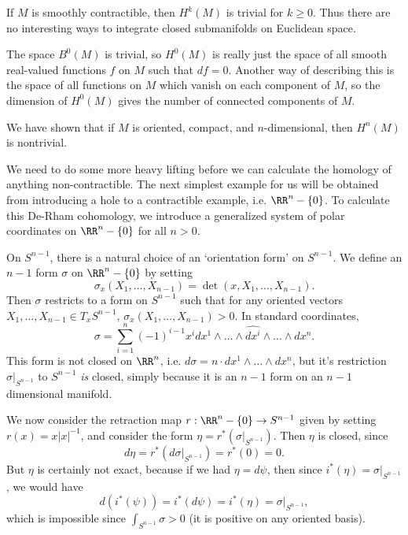 \begin{example}
    If $M$ is smoothly contractible, then $H^k(M)$ is trivial for $k \geq 0$. Thus there are no interesting ways to integrate closed submanifolds on Euclidean space.
\end{example}

\begin{example}
    The space $B^0(M)$ is trivial, so $H^0(M)$ is really just the space of all smooth real-valued functions $f$ on $M$ such that $df = 0$. Another way of describing this is the space of all functions on $M$ which vanish on each component of $M$, so the dimension of $H^0(M)$ gives the number of connected components of $M$.
\end{example}

\begin{example}
    We have shown that if $M$ is oriented, compact, and $n$-dimensional, then $H^n(M)$ is nontrivial.
\end{example}

We need to do some more heavy lifting before we can calculate the homology of anything non-contractible. The next simplest example for us will be obtained from introducing a hole to a contractible example, i.e. $\RR^n - \{ 0 \}$. To calculate this De-Rham cohomology, we introduce a generalized system of polar coordinates on $\RR^n - \{ 0 \}$ for all $n > 0$.

On $S^{n-1}$, there is a natural choice of an `orientation form' on $S^{n-1}$. We define an $n-1$ form $\sigma$ on $\RR^n - \{ 0 \}$ by setting
%
\[ \sigma_x(X_1, \dots, X_{n-1}) = \det(x,X_1, \dots, X_{n-1}). \]
%
Then $\sigma$ restricts to a form on $S^{n-1}$ such that for any oriented vectors $X_1, \dots, X_{n-1} \in T_x S^{n-1}$, $\sigma_x(X_1, \dots, X_{n-1}) > 0$. In standard coordinates,
%
\[ \sigma = \sum_{i = 1}^n (-1)^{i-1} x^i dx^1 \wedge \dots \wedge \widehat{dx^i} \wedge \dots \wedge dx^n. \]
%
This form is not closed on $\RR^n$, i.e. $d\sigma = n \cdot dx^1 \wedge \dots \wedge dx^n$, but it's restriction $\sigma|_{S^{n-1}}$ to $S^{n-1}$ \emph{is} closed, simply because it is an $n-1$ form on an $n-1$ dimensional manifold.

We now consider the retraction map $r: \RR^n - \{ 0 \} \to S^{n-1}$ given by setting $r(x) = x |x|^{-1}$, and consider the form $\eta = r^*( \sigma|_{S^{n-1}} )$. Then $\eta$ is closed, since
%
\[ d\eta = r^*( d \sigma|_{S^{n-1}}) = r^*(0) = 0. \]
%
But $\eta$ is certainly not exact, because if we had $\eta = d\psi$, then since $i^*(\eta) = \sigma|_{S^{n-1}}$, we would have
%
\[ d(i^*(\psi)) = i^*(d\psi) = i^*(\eta) = \sigma|_{S^{n-1}}, \]
%
which is impossible since $\int_{S^{n-1}} \sigma > 0$ (it is positive on any oriented basis).

